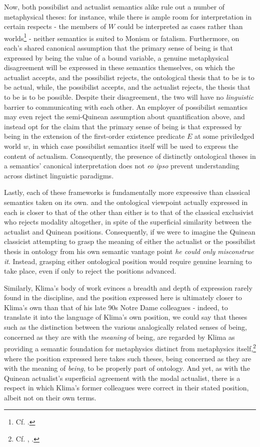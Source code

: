 \documentclass[]{article}
\begin{document}
Now, 
both possibilist and actualist semantics alike rule out a number of metaphysical theses: 
for instance, while there is ample room for interpretation in certain respects - 
the members of $W$ could be interpreted as cases rather than worlds\footnote{Cf. \autocite{CIFOL1,CIFOL2}.} - 
neither semantics is suited to Monism or fatalism. 
Furthermore, 
on each's shared canonical assumption that the primary sense of being is that expressed by being the value of a bound variable, 
a genuine metaphysical disagreement will be expressed in these semantics themselves, 
on which the actualist accepts, 
and the possibilist rejects, 
the ontological thesis that to be is to be actual, 
while, the possibilist accepts, 
and the actualist rejects, 
the thesis that to be is to be possible. 
Despite their disagreement, the two will have no \emph{linguistic} barrier to communicating with each other. 
An employer of possibilist semantics may even reject the semi-Quinean assumption about quantification above, 
and instead opt for the claim 
that the primary sense of being is that expressed by being in the extension of the first-order existence predicate $E$ at some priviledged world $w$, 
in which case possibilist semantics itself will be used to express the content of actualism. 
Consequently, the presence of distinctly ontological theses in a semantics' canonical interpretation does not 
\emph{eo ipso} prevent understanding across distinct linguistic paradigms.  

Lastly, 
each of these frameworks is fundamentally more expressive than classical semantics taken on its own.
and the ontological viewpoint actually expressed in each is closer to that of the other than either is to that of the classical exclusivist who rejects modality altogether, 
in spite of the superficial similarity between the actualist and Quinean positions. 
Consequently, if we were to imagine the Quinean classicist attempting to grasp the meaning of either the actualist or the possibilist thesis in ontology 
from his own semantic vantage point
\emph{he could only misconstrue it}. 
Instead, grasping either ontological position would require genuine learning to take place, 
even if only to reject the positions advanced. 

Similarly, 
Klima's body of work evinces a breadth and depth of expression rarely found in the discipline, 
and 
the position expressed here is ultimately closer to Klima's own than that of his late 90s Notre Dame colleagues - 
indeed, to translate it into the language of Klima's own position, 
we could say that theses such as the distinction between the various analogically related senses of being, 
concerned as they are with the \emph{meaning} of being, 
are regarded by Klima as providing a semantic foundation for metaphysics distinct from metaphysics itself,\footnote{Cf. \autocite[88]{Klima1996}, \autocite[49]{Klima2011b}.}
where the position expressed here takes such theses, 
being concerned as they are with the meaning of \emph{being},
to be properly part of ontology. 
And yet, 
as with the Quinean actualist's superficial agreement with the modal actualist, 
there is a respect in which Klima's former colleagues were correct in their stated position, 
albeit not on their own terms. 
\end{document}
